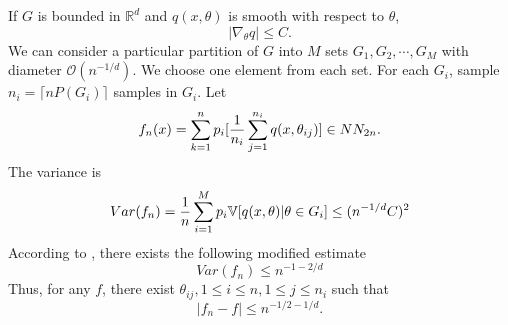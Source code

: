 If $G$ is bounded in $\mathbb{R}^d$ and $q(x,\theta)$ is smooth with respect to $\theta$,
$$
|\nabla_\theta q|\leq C.
$$
We can consider a particular partition of $G$ into  $M$ sets $G_1, G_2, \cdots, G_M$ with diameter $\mathcal{O}(n^{-1/d})$. We choose one element from each set. For each $G_i$, sample $n_i=\lceil nP(G_i)\rceil$ samples in $G_i$.  Let
\begin{equation}
f_n(x)=\sum_{k=1}^n p_i[{1\over n_i}\sum_{j=1}^{n_i}q(x,\theta_{ij})]\in NN_{2n}.
\end{equation}
The variance is 
\begin{equation}
Var(f_n)= {1\over n}\sum_{i=1}^M p_i\mathbb{V}[q(x,\theta)|\theta\in G_i]\leq (n^{-1/d}C)^2
\end{equation}
According to , there exists the following modified estimate 
\begin{equation}
Var(f_n)\leq n^{-1-2/d} 
\end{equation}
Thus, for any $f$, there exist $\theta_{ij}, 1\leq i\leq n, 1\leq j\leq n_i$ such that
\begin{equation}
|f_n-f|\leq  n^{-1/2-1/d}.
\end{equation}

 